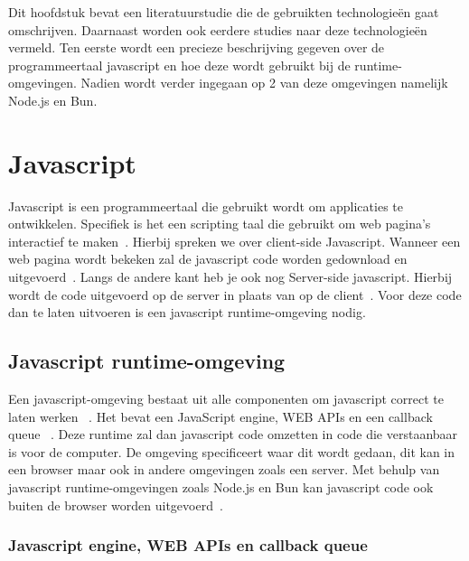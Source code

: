 Dit hoofdstuk bevat een literatuurstudie die de gebruikten technologieën gaat omschrijven. 
Daarnaast worden ook eerdere studies naar deze technologieën vermeld. 
Ten eerste wordt een precieze beschrijving gegeven over de programmeertaal javascript en hoe deze wordt gebruikt bij de runtime-omgevingen.
Nadien wordt verder ingegaan op 2 van deze omgevingen namelijk Node.js en Bun.

\section{Javascript}
Javascript is een programmeertaal die gebruikt wordt om applicaties te ontwikkelen. 
Specifiek is het een scripting taal die gebruikt om web pagina's interactief te maken~\autocite{Mozilla2023}.
Hierbij spreken we over client-side Javascript. Wanneer een web pagina wordt bekeken zal de javascript code worden 
gedownload en uitgevoerd~\autocite{JonathanBrownCFA2024}. Langs de andere kant heb je ook nog Server-side javascript. 
Hierbij wordt de code uitgevoerd op de server in plaats van op de client~\autocite{JonathanBrownCFA2024}. 
Voor deze code dan te laten uitvoeren is een javascript runtime-omgeving nodig. 

\subsection{Javascript runtime-omgeving}
Een javascript-omgeving bestaat uit alle componenten om javascript correct te laten werken ~\autocite{Christopher}. 
Het bevat een JavaScript engine, WEB APIs en een callback queue ~\autocite{Christopher}. 
Deze runtime zal dan javascript code omzetten in code die verstaanbaar is voor de computer.
De omgeving specificeert waar dit wordt gedaan, dit kan in een browser maar ook in andere omgevingen zoals een server.
Met behulp van javascript runtime-omgevingen zoals Node.js en Bun kan javascript code ook buiten de browser worden uitgevoerd~\autocite{Mozilla2023}.

\subsubsection{Javascript engine, WEB APIs en callback queue}


